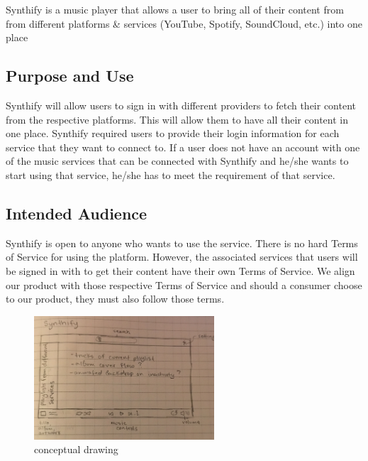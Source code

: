 Synthify is a music player that allows a user to bring all of their content from from different platforms \& services (YouTube, Spotify, SoundCloud, etc.) into one place

\subsection{Purpose and Use}
Synthify will allow users to sign in with different providers to fetch their content from the respective platforms. This will allow them to have all their content in one place. Synthify required users to provide their login information for each service that they want to connect to. If a user does not have an account with one of the music services that can be connected with Synthify and he/she wants to start using that service, he/she has to meet the requirement of that service.

\subsection{Intended Audience}
Synthify is open to anyone who wants to use the service. There is no hard Terms of Service for using the platform. However, the associated services that users will be signed in with to get their content have their own Terms of Service. We align our product with those respective Terms of Service and should a consumer choose to our product, they must also follow those terms.

\begin{figure}[h!]
	\centering
   	\includegraphics[width=0.60\textwidth]{images/concept.png}
    \caption{conceptual drawing}
\end{figure}
